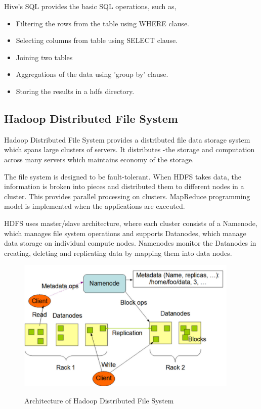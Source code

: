 \documentclass[9pt,twocolumn,twoside]{../../styles/osajnl}
\begin{document}
Hive's SQL provides the basic SQL operations, such as,
\begin{itemize}
  
\item Filtering the rows from the table using WHERE clause.
  
\item Selecting columns from table using SELECT clause.
  
\item Joining two tables
  
\item Aggregations of the data using 'group by' clause.

\item Storing the results in a hdfs directory.

\end{itemize}

\subsection{Hadoop Distributed File System}

Hadoop Distributed File System provides a distributed file data
storage system which spans large clusters of servers. It distributes
-the storage and computation across many servers which maintains
economy of the storage\cite{hdfs}.

The file system is designed to be fault-tolerant. When HDFS takes
data, the information is broken into pieces and distributed them to
different nodes in a cluster. This provides parallel processing on
clusters. MapReduce programming model is implemented when the
applications are executed. 

HDFS uses master/slave architecture, where each cluster consists of a
Namenode, which manages file system operations and supports Datanodes,
which manage data storage on individual compute nodes. Namenodes
monitor the Datanodes in creating, deleting and replicating data by
mapping them into data nodes.

\begin{figure}[ht]
  \includegraphics[width= \linewidth, height =
    2.5in]{images/hdfs_architecture.pdf}
  \caption{Architecture of Hadoop Distributed File
    System}\cite{hdfs-architecture}
\end{figure}
\end{document}
